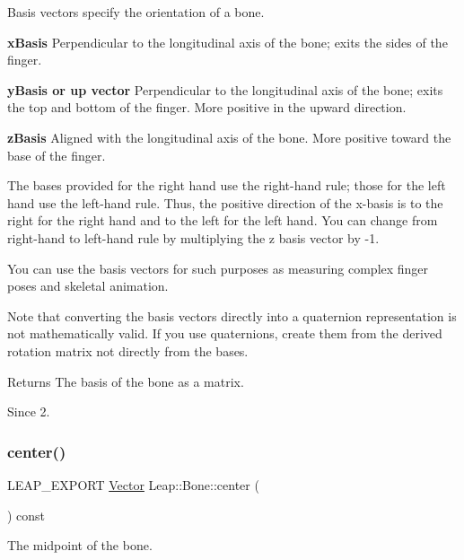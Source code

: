 Basis vectors specify the orientation of a bone.

{\bfseries x\+Basis} Perpendicular to the longitudinal axis of the bone; exits the sides of the finger.

{\bfseries y\+Basis or up vector} Perpendicular to the longitudinal axis of the bone; exits the top and bottom of the finger. More positive in the upward direction.

{\bfseries z\+Basis} Aligned with the longitudinal axis of the bone. More positive toward the base of the finger.

The bases provided for the right hand use the right-\/hand rule; those for the left hand use the left-\/hand rule. Thus, the positive direction of the x-\/basis is to the right for the right hand and to the left for the left hand. You can change from right-\/hand to left-\/hand rule by multiplying the z basis vector by -\/1.

You can use the basis vectors for such purposes as measuring complex finger poses and skeletal animation.

Note that converting the basis vectors directly into a quaternion representation is not mathematically valid. If you use quaternions, create them from the derived rotation matrix not directly from the bases.


\begin{DoxyCodeInclude}
\end{DoxyCodeInclude}


\begin{DoxyReturn}{Returns}
The basis of the bone as a matrix. 
\end{DoxyReturn}
\begin{DoxySince}{Since}
2. 
\end{DoxySince}
\mbox{\label{class_leap_1_1_bone_a0d81133eeea02f5586a927935d50027f}} 
\subsubsection{\texorpdfstring{center()}{center()}}
{\footnotesize\ttfamily L\+E\+A\+P\+\_\+\+E\+X\+P\+O\+RT \hyperlink{struct_leap_1_1_vector}{Vector} Leap\+::\+Bone\+::center (\begin{DoxyParamCaption}{ }\end{DoxyParamCaption}) const}

The midpoint of the bone.


